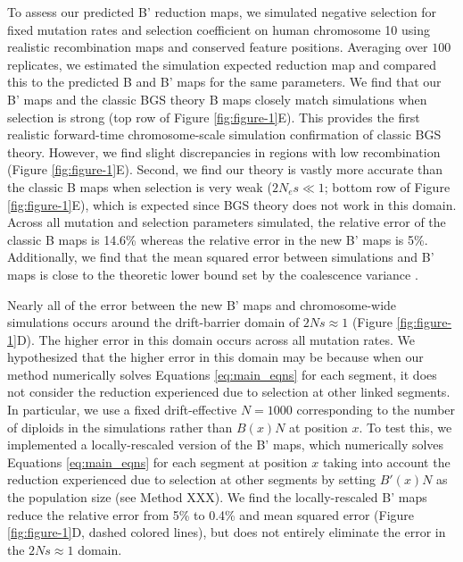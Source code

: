 \documentclass[11pt]{article}
\begin{document}
To assess our predicted B' reduction maps, we simulated negative selection for
fixed mutation rates and selection coefficient on human chromosome 10 using
realistic recombination maps and conserved feature positions. Averaging over
$100$ replicates, we estimated the simulation expected reduction map and
compared this to the predicted B and B' maps for the same parameters. We find
that our B' maps and the classic BGS theory B maps closely match simulations
when selection is strong (top row of Figure \ref{fig:figure-1}E). This provides
the first realistic forward-time chromosome-scale simulation confirmation of
classic BGS theory. However, we find slight discrepancies in regions with low
recombination (Figure \ref{fig:figure-1}E). Second, we find our theory is
vastly more accurate than the classic B maps when selection is very weak ($2N_e
s \ll 1$; bottom row of Figure \ref{fig:figure-1}E), which is expected since
BGS theory does not work in this domain. Across all mutation and selection
parameters simulated, the relative error of the classic B maps is 14.6\%
whereas the relative error in the new B' maps is 5\%. Additionally, we find
that the mean squared error between simulations and B' maps is close to the
theoretic lower bound set by the coalescence variance \parencite[see Methods
XXX]{Tajima1983-gu}.

Nearly all of the error between the new B' maps and chromosome-wide simulations
occurs around the drift-barrier domain of $2Ns \approx 1$ (Figure
\ref{fig:figure-1}D). The higher error in this domain occurs across all
mutation rates. We hypothesized that the higher error in this domain may be
because when our method numerically solves Equations \eqref{eq:main_eqns} for
each segment, it does not consider the reduction experienced due to selection
at other linked segments. In particular, we use a fixed drift-effective
$N=1000$ corresponding to the number of diploids in the simulations rather than
$B(x) N$ at position $x$. To test this, we implemented a locally-rescaled
version of the B' maps, which numerically solves Equations \eqref{eq:main_eqns}
for each segment at position $x$ taking into account the reduction experienced
due to selection at other segments by setting $B'(x)N$ as the population size
(see Method XXX). We find the locally-rescaled B' maps reduce the relative
error from 5\% to 0.4\% and mean squared error (Figure \ref{fig:figure-1}D,
dashed colored lines), but does not entirely eliminate the error in the $2Ns
\approx 1$ domain.
\end{document}
